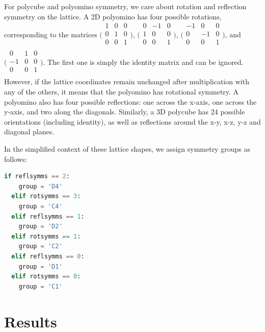 For polycube and polyomino symmetry, we care about rotation and reflection symmetry on the lattice. A 2D polyomino has four possible rotations, corresponding to the matrices $\big(\begin{smallmatrix}
    1 & 0 & 0\\
    0 & 1 & 0\\
    0 & 0 & 1\\
\end{smallmatrix}\big)$, $\big(\begin{smallmatrix}
    0 & -1 & 0\\
    1 & 0 & 0\\
    0 & 0 & 1\\
\end{smallmatrix}\big)$, $\big(\begin{smallmatrix}
    -1 & 0 & 0\\
    0 & -1 & 0\\
    0 & 0 & 1\\
\end{smallmatrix}\big)$, and $\big(\begin{smallmatrix}
    0 & 1 & 0\\
    -1 & 0 & 0\\
    0 & 0 & 1\\
\end{smallmatrix}\big)$. The first one is simply the identity matrix and can be ignored. However, if the lattice coordinates remain unchanged after multiplication with any of the others, it means that the polyomino has rotational symmetry. A polyomino also has four possible reflections: one across the x-axis, one across the y-axis, and two along the diagonals. Similarly, a 3D polycube has 24 possible orientations (including identity), as well as reflections around the x-y, x-z, y-z and diagonal planes.

In the simplified context of these lattice shapes, we assign symmetry groups as follows:
\begin{lstlisting}[language=Python]
  if reflsymms == 2:
    group = 'D4'
  elif rotsymms == 3:
    group = 'C4'
  elif reflsymms == 1:
    group = 'D2'
  elif rotsymms == 1:
    group = 'C2'
  elif reflsymms == 0:
    group = 'D1'
  elif rotsymms == 0:
    group = 'C1'
\end{lstlisting}




\section{Results}

